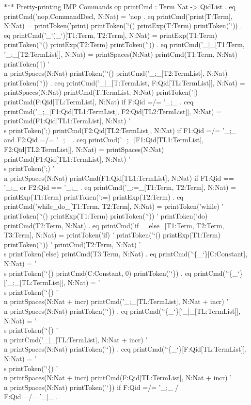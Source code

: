 \documentclass[a4paper,openany]{book}
\begin{document}
 *** Pretty-printing IMP Commands
 op printCmd : Term Nat -> QidList .
 eq printCmd('nop.CommandDecl, N:Nat) = 'nop .
 eq printCmd('print[T:Term], N:Nat) =
    printToken('print) printToken('`() printExp(T:Term) printToken('`)) .
 eq printCmd('_`(_`)[T1:Term, T2:Term], N:Nat) =
    printExp(T1:Term) printToken('`() printExp(T2:Term) printToken('`)) .
 eq printCmd('_|_[T1:Term, '_;_[T2:TermList]], N:Nat) =
    printSpaces(N:Nat)
    printCmd(T1:Term, N:Nat) printToken('|) '\\n
    printSpaces(N:Nat) printToken('`() 
    printCmd('_;_[T2:TermList], N:Nat) printToken('`)) .
ceq printCmd('_|_[T:TermList, F:Qid[TL:TermList]], N:Nat) =
    printSpaces(N:Nat) printCmd(T:TermList, N:Nat) printToken('|)
    printCmd(F:Qid[TL:TermList], N:Nat)
 if F:Qid =/= '_;_ .
ceq printCmd('_;_[F1:Qid[TL1:TermList], F2:Qid[TL2:TermList]], N:Nat) =
    printCmd(F1:Qid[TL1:TermList], N:Nat) '\\s printToken(';)
    printCmd(F2:Qid[TL2:TermList], N:Nat)
 if F1:Qid =/= '_;_ and F2:Qid =/= '_;_ .
ceq printCmd('_;_[F1:Qid[TL1:TermList], F2:Qid[TL2:TermList]], N:Nat) =
    printSpaces(N:Nat) 
    printCmd(F1:Qid[TL1:TermList], N:Nat) '\\s printToken(';) '\\n
    printSpaces(N:Nat) 
    printCmd(F1:Qid[TL1:TermList], N:Nat)
 if F1:Qid == '_;_ or F2:Qid == '_;_ .
 eq printCmd('_:=_[T1:Term, T2:Term], N:Nat) =
    printExp(T1:Term) printToken(':=) printExp(T2:Term) .
 eq printCmd('while_do_[T1:Term, T2:Term], N:Nat) =
    printToken('while) ' printToken('`() printExp(T1:Term) printToken('`)) '
    printToken('do)
    printCmd(T2:Term, N:Nat) .
 eq printCmd('if__else_[T1:Term, T2:Term, T3:Term], N:Nat) =
    printToken('if) ' printToken('`() printExp(T1:Term) printToken('`)) '
    printCmd(T2:Term, N:Nat)
    '\\s printToken('else) printCmd(T3:Term, N:Nat) .
 eq printCmd('`\{_`\}[C:Constant], N:Nat) =
    '\\s printToken('`\{) 
    printCmd(C:Constant, 0) 
    printToken('`\}) .
 eq printCmd('`\{_`\}['_;_[TL:TermList]], N:Nat) =
    '\\s printToken('`\{) '\\n
    printSpaces(N:Nat + incr) 
    printCmd('_;_[TL:TermList], N:Nat + incr) '\\n
    printSpaces(N:Nat) printToken('`\}) .
 eq printCmd('`\{_`\}['_|_[TL:TermList]], N:Nat) =
    '\\s printToken('`\{) '\\n 
    printCmd('_|_[TL:TermList], N:Nat + incr) '\\n
    printSpaces(N:Nat) printToken('`\}) .
ceq printCmd('`\{_`\}[F:Qid[TL:TermList]], N:Nat) =
    '\\s printToken('`\{) '\\n
    printSpaces(N:Nat + incr) 
    printCmd(F:Qid[TL:TermList], N:Nat + incr) '\\n
    printSpaces(N:Nat) printToken('`\})
 if F:Qid =/= '_;_ /\\ F:Qid =/= '_|_ .
\end{document}
